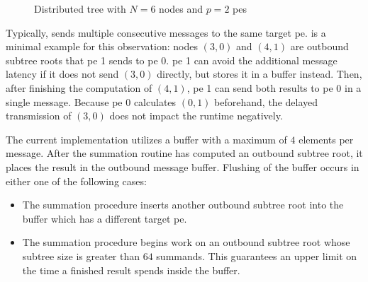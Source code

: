 \begin{figure}
\centering
{}
\caption{Distributed tree with $N=6$ nodes and $p=2$ \glspl{pe}}
\label{fig:messageBufferingTree}
\end{figure}

Typically,  sends multiple consecutive messages to the same target \gls{pe}.
 is a minimal example for this observation: nodes $(3,0)$ and $(4,1)$ are outbound subtree roots that \gls{pe} 1 sends to \gls{pe} 0.
\gls{pe} 1 can avoid the additional message latency if it does not send $(3,0)$ directly, but stores it in a buffer instead.
Then, after finishing the computation of $(4,1)$, \gls{pe} 1 can send both results to \gls{pe} 0 in a single message.
Because \gls{pe} 0 calculates $(0,1)$ beforehand, the delayed transmission of $(3,0)$ does not impact the runtime negatively.

The current implementation utilizes a buffer with a maximum of $4$ elements per message.
After the summation routine has computed an outbound subtree root, it places the result in the outbound message buffer.
Flushing of the buffer occurs in either one of the following cases: \begin{itemize} 
\item The summation procedure inserts another outbound subtree root into the buffer which has a different target \gls{pe}.
\item The summation procedure begins work on an outbound subtree root whose subtree size is greater than $64$ summands. This guarantees an upper limit on the time a finished result spends inside the buffer.
\end{itemize}

